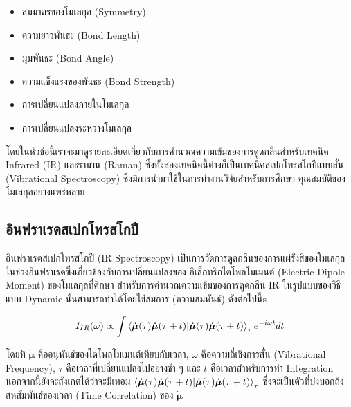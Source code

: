 \begin{itemize}
    \item สมมาตรของโมเลกุล (Symmetry)
    
    \item ความยาวพันธะ (Bond Length)
    
    \item มุมพันธะ (Bond Angle)
    
    \item ความแข็งแรงของพันธะ (Bond Strength)
    
    \item การเปลี่ยนแปลงภายในโมเลกุล
    
    \item การเปลี่ยนแปลงระหว่างโมเลกุล
\end{itemize}

โดยในหัวข้อนี้เราจะมาดูรายละเอียดเกี่ยวกับการคำนวณความเข้มของการดูดกลืนสำหรับเทคนิค Infrared (IR) และรามาน (Raman) 
ซึ่งทั้งสองเทคนิคนี้ต่างก็เป็นเทคนิคสเปกโทรสโกปีแบบสั่น (Vibrational Spectroscopy) ซึ่งมีการนำมาใช้ในการทำงานวิจัยสำหรับการศึกษา%
คุณสมบัติของโมเลกุลอย่างแพร่หลาย

\subsection{อินฟราเรดสเปกโทรสโกปี}
\label{ssec:ir_spectro}

อินฟราเรดสเปกโทรสโกปี (IR Spectroscopy) เป็นการวัดการดูดกลืนของการแผ่รังสีของโมเลกุลในช่วงอินฟราเรดซึ่งเกี่ยวข้องกับการเปลี่ยนแปลงของ%
อิเล็กทริกไดโพลโมเมนต์ (Electric Dipole Moment) ของโมเลกุลที่ศึกษา สำหรับการคำนวณความเข้มของการดูดกลืน IR ในรูปแบบของวิธีแบบ
Dynamic นั้นสามารถทำได้โดยใช้สมการ (ความสมพันธ์) ดังต่อไปนี้s\autocite{thomas2013}

\begin{equation}\label{eq:IR_corr}
    I_{IR} (\omega) \propto \int \braket{\bm{\dot{\mu}}(\tau) \bm{\dot{\mu}}(\tau+t)}_{\tau} e^{-i \omega t} dt
\end{equation}

\noindent โดยที่ $\bm{\dot{\mu}}$ คืออนุพันธ์ของไดโพลโมเมนต์เทียบกับเวลา, $\omega$ คือความถี่เชิงการสั่น (Vibrational Frequency),
$\tau$ คือเวลาที่เปลี่ยนแปลงไปอย่างช้า ๆ และ $t$ คือเวลาสำหรับการทำ Integration นอกจากนี้ยังจะสังเกตได้ว่าจะมีเทอม
$\braket{\bm{\dot{\mu}}(\tau) \bm{\dot{\mu}}(\tau+t)}_{\tau}$ ซึ่งจะเป็นตัวที่บ่งบอกถึงสหสัมพันธ์ของเวลา (Time Correlation) 
ของ $\bm{\dot{\mu}}$ 

